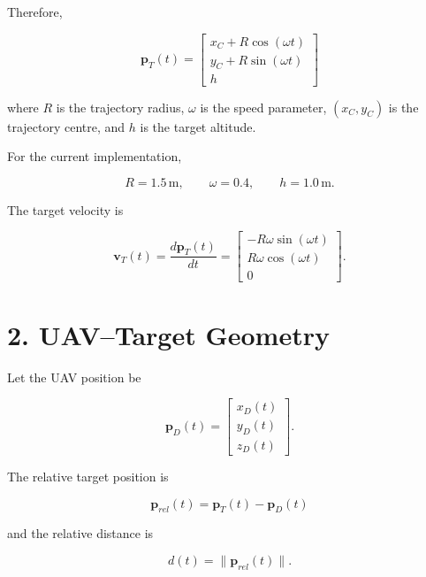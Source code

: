 \documentclass[12pt,a4paper]{article}
\begin{document}
Therefore,

\begin{equation}
\boxed{
\mathbf{p}_T(t)=
\begin{bmatrix}
x_C+R\cos(\omega t)\\
y_C+R\sin(\omega t)\\
h
\end{bmatrix}
}
\end{equation}

where $R$ is the trajectory radius, $\omega$ is the speed parameter, $(x_C,y_C)$ is the trajectory centre, and $h$ is the target altitude.

For the current implementation,

\begin{equation}
R=1.5\,\mathrm{m},\qquad
\omega=0.4,\qquad
h=1.0\,\mathrm{m}.
\end{equation}

The target velocity is

\begin{equation}
\mathbf{v}_T(t)=
\frac{d\mathbf{p}_T(t)}{dt}
=
\begin{bmatrix}
-R\omega\sin(\omega t)\\
R\omega\cos(\omega t)\\
0
\end{bmatrix}.
\end{equation}

\section{2. UAV--Target Geometry}

Let the UAV position be

\begin{equation}
\mathbf{p}_D(t)=
\begin{bmatrix}
x_D(t)\\y_D(t)\\z_D(t)
\end{bmatrix}.
\end{equation}

The relative target position is

\begin{equation}
\boxed{
\mathbf{p}_{rel}(t)=\mathbf{p}_T(t)-\mathbf{p}_D(t)
}
\end{equation}

and the relative distance is

\begin{equation}
d(t)=\|\mathbf{p}_{rel}(t)\|.
\end{equation}
\end{document}
